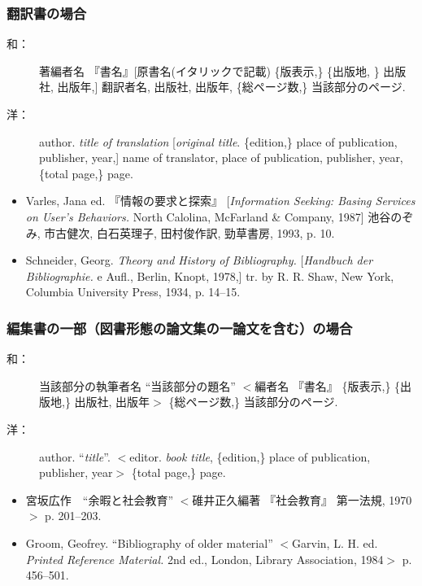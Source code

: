 		\subsubsection{翻訳書の場合}

			\begin{description}
				\item[和：] 著編者名 『書名』[原書名(イタリックで記載) \{版表示,\}
				\{出版地, \} 出版社, 出版年,] 翻訳者名, 出版社, 出版年, \{総ページ数,\} 当該部分のページ.
				\item[洋：] author. \textit{title of translation} [\textit{original title}. \{edition,\} place of publication, publisher, year,] name of translator, place of publication, publisher, year, \{total page,\} page.
			\end{description}

			\begin{screen} \begin{itemize}
				\item Varles, Jana ed. 『情報の要求と探索』 [\textit{Information Seeking:
				 Basing Services on User's Behaviors.} North Calolina,
				 McFarland \& Company, 1987] 池谷のぞみ, 	市古健次, 白石英理子, 田村俊作訳,
				 勁草書房, 1993, p. 10.

				\item Schneider, Georg. \textit{Theory and History of Bibliography.}
				 [\textit{Handbuch der Bibliographie.} e Aufl., Berlin, Knopt, 1978,]
				 tr. by R. R. Shaw, New York, Columbia University Press, 1934, p. 14--15.
			\end{itemize} \end{screen}

		\subsubsection{編集書の一部（図書形態の論文集の一論文を含む）の場合}

			\begin{description}
				\item[和：] 当該部分の執筆者名 ``当該部分の題名'' $<$編者名 『書名』 \{版表示,\} \{出版地,\} 出版社, 出版年$>$ \{総ページ数,\} 当該部分のページ.
				\item[洋：] author. ``\textit{title}''. $<$editor. \textit{book title}, \{edition,\} place of publication, publisher, year$>$ \{total page,\} page.
			\end{description}

			\begin{screen} \begin{itemize}
				\item 宮坂広作　``余暇と社会教育'' $<$碓井正久編著 『社会教育』 第一法規, 1970$>$ p. 201--203.

				\item Groom, Geofrey. ``Bibliography of older material'' $<$Garvin, L. H. ed. \textit{Printed Reference Material.} 2nd ed., London, Library Association, 1984$>$ p. 456--501.
			\end{itemize} \end{screen}


